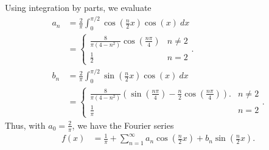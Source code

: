 \documentclass[10pt]{mypackage}
\begin{document}
\begin{solution}[11.2, Problem 10]
  Using integration by parts, we evaluate
  \begin{align*}
    a_n &= \frac{2}{\pi} \int_{0}^{\pi/2} \cos\left( \frac{n}{2}x \right)\cos\left( x \right)\:dx\\
        &= \begin{cases}
          \frac{8}{\pi\left( 4-n^2 \right)} \cos\left( \frac{n\pi}{4} \right) & n\neq 2\\
          \frac{1}{2} & n = 2
        \end{cases}.\\
    b_n &= \frac{2}{\pi} \int_{0}^{\pi/2} \sin\left( \frac{n}{2}x \right)\cos\left( x \right)\:dx\\
        &= 
        \begin{cases}
          \frac{8}{\pi\left( 4-n^2 \right)}\left( \sin\left( \frac{n\pi}{4} \right) - \frac{n}{2}\cos\left( \frac{n\pi}{4} \right) \right). & n\neq 2\\
          \frac{1}{\pi} & n = 2
        \end{cases}.
  \end{align*}
  Thus, with $a_0 = \frac{2}{\pi}$, we have the Fourier series 
  \begin{align*}
    f(x) &= \frac{1}{\pi} + \sum_{n=1}^{\infty}a_n\cos\left( \frac{n}{2}x \right) + b_n\sin\left( \frac{n}{2}x \right).
  \end{align*}
\end{solution}
\end{document}
